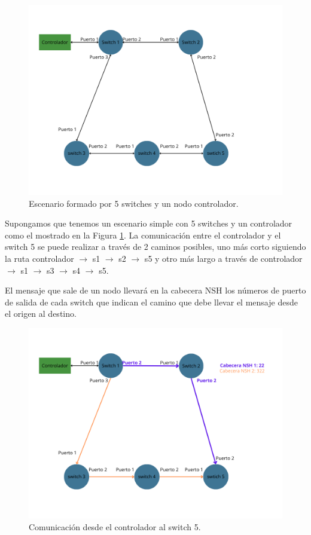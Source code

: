 \documentclass[a4paper, 12pt]{book}
\begin{document}
	\begin{figure}[H]
		\centering
		\includegraphics[width=16cm, keepaspectratio]{img/Ejemplo Periplus 1}
		\caption{Escenario formado por 5 switches y un nodo controlador.}
		\label{figura:PeriplusEj1}
	\end{figure}
	
	Supongamos que tenemos un escenario simple con 5 switches y un controlador como el mostrado en la Figura \ref{figura:PeriplusEj1}. La comunicación entre el controlador y el switch 5 se puede realizar a través de 2 caminos posibles, uno más corto siguiendo la ruta controlador $\rightarrow$ s1 $\rightarrow$ s2 $\rightarrow$ s5 y otro más largo a través de controlador $\rightarrow$ s1 $\rightarrow$ s3 $\rightarrow$ s4 $\rightarrow$ s5. 
	
	El mensaje que sale de un nodo llevará en la cabecera NSH los números de puerto de salida de cada
	switch que indican el camino que debe llevar el mensaje desde el origen al destino.
	
	\begin{figure}[H]
		\centering
		\includegraphics[width=16cm, keepaspectratio]{img/Ejemplo Periplus 2}
		\caption{Comunicación desde el controlador al switch 5.}
		\label{figura:PeriplusEj2}
	\end{figure}
	
\end{document}

